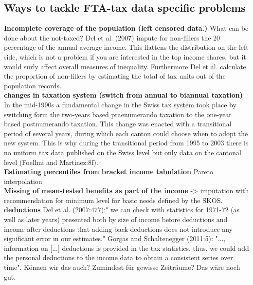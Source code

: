 \documentclass[twoside]{article}\usepackage[]{graphicx}\usepackage[]{color}
\begin{document}
\begin{multicols}{2}
\subsection{Ways to tackle FTA-tax data specific problems}

\textbf{Incomplete coverage of the population (left censored data.)} What can be done about the not-taxed? Del et al. (2007) impute for non-fillers the 20 percentage of the annual average income. This flattens the distribution on the left side, which is not a problem if you are interested in the top income shares, but it would surly affect overall measures of inequality. Furthermore Del et al. calculate the proportion of non-fillers by estimating the total of tax units out of the population records. \\

\textbf{changes in taxation system  (switch from annual to biannual taxation)} In the mid-1990s a fundamental change in the Swiss tax system took place by switching form the two-years based praenumerando taxation to the one-year based postnumerando taxation. This change was enacted with a transitional period of several years, during which each canton could choose when to adopt the new system.  This is why during the transitional period from 1995 to 2003 there is no uniform tax data published on the Swiss level but only data on the cantonal level  (Foellmi and Martinez:8f). \\

\textbf{Estimating percentiles from bracket income tabulation} Pareto interpolation \\ 

\textbf{Missing of mean-tested benefits as part of the income} -> imputation with recommendation for minimum level for basic needs defined by the SKOS.\\

\textbf{deductions} Del et al. (2007:477):" we can check with statistics for 1971-72 (as well as later years) presented both by size of income before deductions and income after deductions that adding back deductions does not introduce any significant error in our estimates."
Gorgas and Schaltenegger (2011:5): "..., information on [...] deductions is provided in the tax statistics, thus, we could add the personal deductions to the income data to obtain a consistent series over time". Können wir das auch? Zumindest für gewisse Zeiträume? Das wäre noch gut. \\


\end{multicols}
\end{document}
